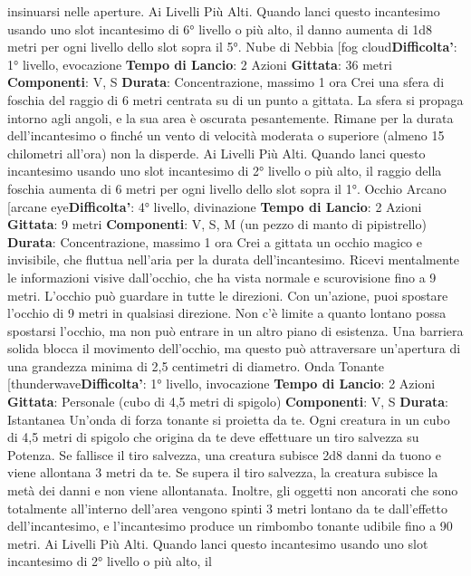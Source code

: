 \begin{multicols}{2}
insinuarsi nelle aperture.
Ai Livelli Più Alti. Quando lanci questo incantesimo
usando uno slot incantesimo di 6° livello o più alto, il
danno aumenta di 1d8 metri per ogni livello dello slot
sopra il 5°.
Nube di Nebbia
[fog cloud\textbf{Difficolta'}:
1° livello, evocazione
\textbf{Tempo di Lancio}: 2 Azioni
\textbf{Gittata}: 36 metri
\textbf{Componenti}: V, S
\textbf{Durata}: Concentrazione, massimo 1 ora
Crei una sfera di foschia del raggio di 6 metri centrata
su di un punto a gittata. La sfera si propaga intorno agli
angoli, e la sua area è oscurata pesantemente. Rimane
per la durata dell’incantesimo o finché un vento di
velocità moderata o superiore (almeno 15 chilometri
all’ora) non la disperde.
Ai Livelli Più Alti. Quando lanci questo incantesimo
usando uno slot incantesimo di 2° livello o più alto, il
raggio della foschia aumenta di 6 metri per ogni livello
dello slot sopra il 1°.
Occhio Arcano
[arcane eye\textbf{Difficolta'}:
4° livello, divinazione
\textbf{Tempo di Lancio}: 2 Azioni
\textbf{Gittata}: 9 metri
\textbf{Componenti}: V, S, M (un pezzo di manto di pipistrello)
\textbf{Durata}: Concentrazione, massimo 1 ora
Crei a gittata un occhio magico e invisibile, che fluttua
nell’aria per la durata dell’incantesimo.
Ricevi mentalmente le informazioni visive dall’occhio,
che ha vista normale e scurovisione fino a 9 metri.
L’occhio può guardare in tutte le direzioni.
Con un’azione, puoi spostare l’occhio di 9 metri in
qualsiasi direzione. Non c’è limite a quanto lontano
possa spostarsi l’occhio, ma non può entrare in un altro
piano di esistenza. Una barriera solida blocca il
movimento dell’occhio, ma questo può attraversare
un’apertura di una grandezza minima di 2,5 centimetri
di diametro.
Onda Tonante
[thunderwave\textbf{Difficolta'}:
1° livello, invocazione
\textbf{Tempo di Lancio}: 2 Azioni
\textbf{Gittata}: Personale (cubo di 4,5 metri di spigolo)
\textbf{Componenti}: V, S
\textbf{Durata}: Istantanea
Un’onda di forza tonante si proietta da te. Ogni creatura
in un cubo di 4,5 metri di spigolo che origina da te deve
effettuare un tiro salvezza su Potenza. Se fallisce il
tiro salvezza, una creatura subisce 2d8 danni da tuono
e viene allontana 3 metri da te. Se supera il tiro
salvezza, la creatura subisce la metà dei danni e non
viene allontanata.
Inoltre, gli oggetti non ancorati che sono totalmente
all’interno dell’area vengono spinti 3 metri lontano da te
dall’effetto dell’incantesimo, e l’incantesimo produce un
rimbombo tonante udibile fino a 90 metri.
Ai Livelli Più Alti. Quando lanci questo incantesimo
usando uno slot incantesimo di 2° livello o più alto, il

\end{multicols}
